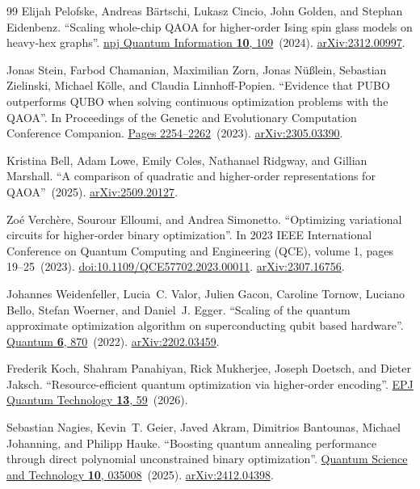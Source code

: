 \documentclass[a4paper,onecolumn,11pt,unpublished]{quantumarticle}
\theoremstyle{remark}
\begin{document}
\begin{thebibliography}{99}
Elijah Pelofske, Andreas B{\"a}rtschi, Lukasz Cincio, John Golden, and Stephan Eidenbenz.
\newblock ``Scaling whole-chip QAOA for higher-order Ising spin glass models on heavy-hex graphs''.
\newblock \href{https://dx.doi.org/10.1038/s41534-024-00906-w}{npj Quantum Information {\bf 10}, 109}~(2024).
\newblock \href{http://arxiv.org/abs/2312.00997}{arXiv:2312.00997}.

Jonas Stein, Farbod Chamanian, Maximilian Zorn, Jonas N{\"u}{\ss}lein, Sebastian Zielinski, Michael K{\"o}lle, and Claudia Linnhoff-Popien.
\newblock ``Evidence that PUBO outperforms QUBO when solving continuous optimization problems with the QAOA''.
\newblock In Proceedings of the Genetic and Evolutionary Computation Conference Companion.
\newblock \href{https://dx.doi.org/10.1145/3583133.3596358}{Pages 2254--2262}~(2023).
\newblock \href{http://arxiv.org/abs/2305.03390}{arXiv:2305.03390}.

Kristina Bell, Adam Lowe, Emily Coles, Nathanael Ridgway, and Gillian Marshall.
\newblock ``A comparison of quadratic and higher-order representations for QAOA''~(2025).
\newblock \href{http://arxiv.org/abs/2509.20127}{arXiv:2509.20127}.

Zo{\'e} Verch{\`e}re, Sourour Elloumi, and Andrea Simonetto.
\newblock ``Optimizing variational circuits for higher-order binary optimization''.
\newblock In 2023 IEEE International Conference on Quantum Computing and Engineering (QCE), volume 1, pages 19--25~(2023).
\newblock \href{https://dx.doi.org/10.1109/QCE57702.2023.00011}{doi:10.1109/QCE57702.2023.00011}.
\newblock \href{http://arxiv.org/abs/2307.16756}{arXiv:2307.16756}.

Johannes Weidenfeller, Lucia~C. Valor, Julien Gacon, Caroline Tornow, Luciano Bello, Stefan Woerner, and Daniel~J. Egger.
\newblock ``Scaling of the quantum approximate optimization algorithm on superconducting qubit based hardware''.
\newblock \href{https://dx.doi.org/10.22331/q-2022-12-07-870}{Quantum {\bf 6}, 870}~(2022).
\newblock \href{http://arxiv.org/abs/2202.03459}{arXiv:2202.03459}.

Frederik Koch, Shahram Panahiyan, Rick Mukherjee, Joseph Doetsch, and Dieter Jaksch.
\newblock ``Resource-efficient quantum optimization via higher-order encoding''.
\newblock \href{https://dx.doi.org/10.1140/epjqt/s40507-026-00526-7}{EPJ Quantum Technology {\bf 13}, 59}~(2026).

Sebastian Nagies, Kevin~T. Geier, Javed Akram, Dimitrios Bantounas, Michael Johanning, and Philipp Hauke.
\newblock ``Boosting quantum annealing performance through direct polynomial unconstrained binary optimization''.
\newblock \href{https://dx.doi.org/10.1088/2058-9565/adcae6}{Quantum Science and Technology {\bf 10}, 035008}~(2025).
\newblock \href{http://arxiv.org/abs/2412.04398}{arXiv:2412.04398}.


\end{thebibliography}
\end{document}
